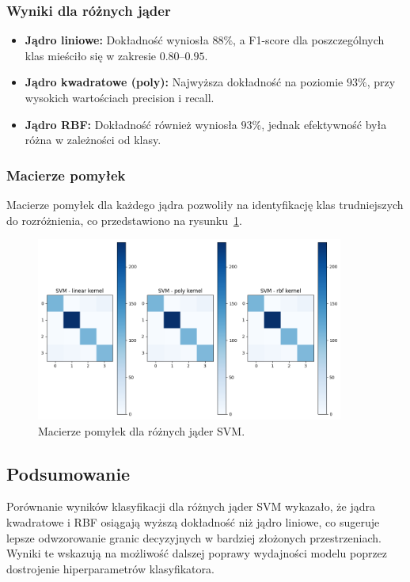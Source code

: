 \subsubsection{Wyniki dla różnych jąder}
\begin{itemize}
    \item \textbf{Jądro liniowe:} Dokładność wyniosła $88\%$, a F1-score dla poszczególnych klas mieściło się w zakresie $0.80$--$0.95$. 
    \item \textbf{Jądro kwadratowe (poly):} Najwyższa dokładność na poziomie $93\%$, przy wysokich wartościach precision i recall.
    \item \textbf{Jądro RBF:} Dokładność również wyniosła $93\%$, jednak efektywność była różna w zależności od klasy.
\end{itemize}

\subsubsection{Macierze pomyłek}
Macierze pomyłek dla każdego jądra pozwoliły na identyfikację klas trudniejszych do rozróżnienia, co przedstawiono na rysunku~\ref{fig:confusion_matrix}.
\begin{figure}[h!]
    \centering
    \includegraphics[width=0.9\textwidth]{img/svm.png}
    \caption{Macierze pomyłek dla różnych jąder SVM.}
    \label{fig:confusion_matrix}
\end{figure}

\subsection{Podsumowanie}
Porównanie wyników klasyfikacji dla różnych jąder SVM wykazało, że jądra kwadratowe i RBF osiągają wyższą dokładność niż jądro liniowe, co sugeruje lepsze odwzorowanie granic decyzyjnych w bardziej złożonych przestrzeniach. Wyniki te wskazują na możliwość dalszej poprawy wydajności modelu poprzez dostrojenie hiperparametrów klasyfikatora.
